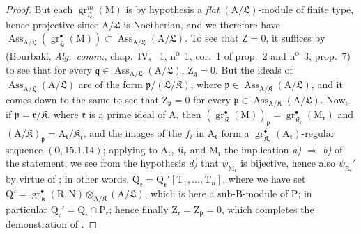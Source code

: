 \begin{proof}
But each $\operatorname{gr}_\mathfrak{L}^m(\mathrm{M})$ is by hypothesis a \emph{flat} $(\mathrm{A}/\mathfrak{L})$-module of finite type, hence projective since $\mathrm{A}/\mathfrak{L}$ is Noetherian, and we therefore have $\operatorname{Ass}_{\mathrm{A}/\mathfrak{L}}(\operatorname{gr}_\mathfrak{L}^\bullet(\mathrm{M}))\subset\operatorname{Ass}_{\mathrm{A}/\mathfrak{L}}(\mathrm{A}/\mathfrak{L})$. To see that $\mathrm{Z}=0$, it suffices by (Bourbaki, \emph{Alg.~comm.}, chap.~IV, \textsection~1, n\textsuperscript{o}~1, cor.~1 of prop.~2 and n\textsuperscript{o}~3, prop.~7) to see that for every $\mathfrak{q}\in\operatorname{Ass}_{\mathrm{A}/\mathfrak{L}}(\mathrm{A}/\mathfrak{L})$, $\mathrm{Z}_\mathfrak{q}=0$. But the ideals of $\operatorname{Ass}_{\mathrm{A}/\mathfrak{L}}(\mathrm{A}/\mathfrak{L})$ are of the form $\mathfrak{p}/(\mathfrak{L}/\mathfrak K)$, where $\mathfrak{p}\in\operatorname{Ass}_{\mathrm{A}/\mathfrak K}(\mathrm{A}/\mathfrak{L})$, and it comes down to the same to see that $\mathrm{Z}_\mathfrak{p}=0$ for every $\mathfrak{p}\in\operatorname{Ass}_{\mathrm{A}/\mathfrak K}(\mathrm{A}/\mathfrak{L})$. Now, if $\mathfrak{p}=\mathfrak{r}/\mathfrak K$, where $\mathfrak{r}$ is a prime ideal of $\mathrm{A}$, then $(\operatorname{gr}_\mathfrak K^\bullet(\mathrm{M}))_\mathfrak{p}=\operatorname{gr}_{\mathfrak K_\mathfrak{r}}^\bullet(\mathrm{M}_\mathfrak{r})$ and $(\mathrm{A}/\mathfrak K)_\mathfrak{p}=\mathrm{A}_\mathfrak{r}/\mathfrak K_\mathfrak{r}$, and the images of the $f_i$ in $\mathrm{A}_\mathfrak{r}$ form a $\operatorname{gr}_{\mathfrak K_\mathfrak{r}}^\bullet(\mathrm{A}_\mathfrak{r})$-regular sequence $(\mathbf{0},15.1.14)$; applying to $\mathrm{A}_\mathfrak{r}$, $\mathfrak K_\mathfrak{r}$ and $\mathrm{M}_\mathfrak{r}$ the implication \emph{a)} $\Rightarrow$ \emph{b)} of the statement, we see from the hypothesis \emph{d)} that $\psi_{\mathrm{M}_\mathfrak{r}}$ is bijective, hence also $\psi_{\mathrm{R}_\mathfrak{r}}'$ by virtue of ; in other words, $\mathrm{Q}_\mathfrak{r}=\mathrm{Q}_\mathfrak{r}'[\mathrm{T}_1,\ldots,\mathrm{T}_n]$, where we have set $\mathrm{Q}'=\operatorname{gr}_\mathfrak K^\bullet(\mathrm{R},\mathrm{N})\otimes_{\mathrm{A}/\mathfrak K}(\mathrm{A}/\mathfrak{L})$, which is here a sub-$\mathrm{B}$-module of $\mathrm{P}$; in particular $\mathrm{Q}_\mathfrak{r}'=\mathrm{Q}_\mathfrak{r}\cap\mathrm{P}_\mathfrak{r}$; hence finally $\mathrm{Z}_\mathfrak{r}=\mathrm{Z}_\mathfrak{p}=0$, which completes the demonstration of .


\end{proof}
